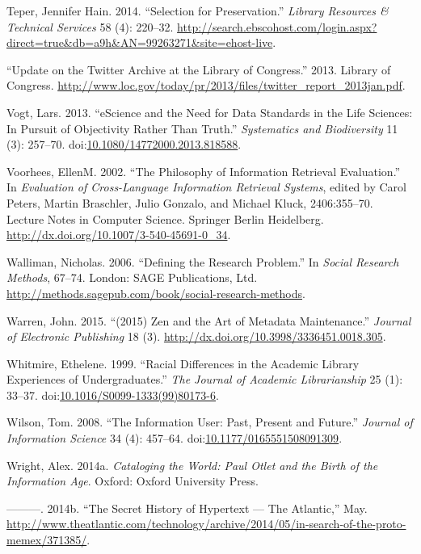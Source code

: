 \documentclass[]{article}
\begin{document}
\hypertarget{ref-teperux5fselectionux5f2014}{}
Teper, Jennifer Hain. 2014. ``Selection for Preservation.''
\emph{Library Resources \& Technical Services} 58 (4): 220--32.
\url{http://search.ebscohost.com/login.aspx?direct=true\&db=a9h\&AN=99263271\&site=ehost-live}.

\hypertarget{ref-ux5fupdateux5f2013}{}
``Update on the Twitter Archive at the Library of Congress.'' 2013.
Library of Congress.
\url{http://www.loc.gov/today/pr/2013/files/twitter_report_2013jan.pdf}.

\hypertarget{ref-vogtux5fescienceux5f2013}{}
Vogt, Lars. 2013. ``eScience and the Need for Data Standards in the Life
Sciences: In Pursuit of Objectivity Rather Than Truth.''
\emph{Systematics and Biodiversity} 11 (3): 257--70.
doi:\href{https://doi.org/10.1080/14772000.2013.818588}{10.1080/14772000.2013.818588}.

\hypertarget{ref-petersux5fphilosophyux5f2002}{}
Voorhees, EllenM. 2002. ``The Philosophy of Information Retrieval
Evaluation.'' In \emph{Evaluation of Cross-Language Information
Retrieval Systems}, edited by Carol Peters, Martin Braschler, Julio
Gonzalo, and Michael Kluck, 2406:355--70. Lecture Notes in Computer
Science. Springer Berlin Heidelberg.
\url{http://dx.doi.org/10.1007/3-540-45691-0_34}.

\hypertarget{ref-wallimanux5fdefiningux5f2006}{}
Walliman, Nicholas. 2006. ``Defining the Research Problem.'' In
\emph{Social Research Methods}, 67--74. London: SAGE Publications, Ltd.
\url{http://methods.sagepub.com/book/social-research-methods}.

\hypertarget{ref-warrenux5f2015ux5f2015}{}
Warren, John. 2015. ``(2015) Zen and the Art of Metadata Maintenance.''
\emph{Journal of Electronic Publishing} 18 (3).
\url{http://dx.doi.org/10.3998/3336451.0018.305}.

\hypertarget{ref-whitmireux5fracialux5f1999}{}
Whitmire, Ethelene. 1999. ``Racial Differences in the Academic Library
Experiences of Undergraduates.'' \emph{The Journal of Academic
Librarianship} 25 (1): 33--37.
doi:\href{https://doi.org/10.1016/S0099-1333(99)80173-6}{10.1016/S0099-1333(99)80173-6}.

\hypertarget{ref-wilsonux5finformationux5f2008}{}
Wilson, Tom. 2008. ``The Information User: Past, Present and Future.''
\emph{Journal of Information Science} 34 (4): 457--64.
doi:\href{https://doi.org/10.1177/0165551508091309}{10.1177/0165551508091309}.

\hypertarget{ref-wrightux5fcatalogingux5f2014}{}
Wright, Alex. 2014a. \emph{Cataloging the World: Paul Otlet and the
Birth of the Information Age}. Oxford: Oxford University Press.

\hypertarget{ref-wrightux5fsecretux5f2014}{}
---------. 2014b. ``The Secret History of Hypertext --- The Atlantic,''
May.
\url{http://www.theatlantic.com/technology/archive/2014/05/in-search-of-the-proto-memex/371385/}.
\end{document}
